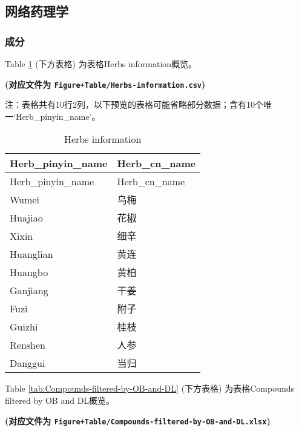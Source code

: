 \documentclass[
]{article}
\begin{document}
\hypertarget{ux7f51ux7edcux836fux7406ux5b66}{%
\subsection{网络药理学}\label{ux7f51ux7edcux836fux7406ux5b66}}

\hypertarget{ux6210ux5206}{%
\subsubsection{成分}\label{ux6210ux5206}}

Table \ref{tab:Herbs-information} (下方表格) 为表格Herbs information概览。

\textbf{(对应文件为 \texttt{Figure+Table/Herbs-information.csv})}

\begin{center}\begin{tcolorbox}[colback=gray!10, colframe=gray!50, width=0.9\linewidth, arc=1mm, boxrule=0.5pt]注：表格共有10行2列，以下预览的表格可能省略部分数据；含有10个唯一`Herb\_pinyin\_name'。
\end{tcolorbox}
\end{center}

\begin{longtable}[]{@{}ll@{}}
\caption{\label{tab:Herbs-information}Herbs information}\tabularnewline
\toprule
Herb\_pinyin\_name & Herb\_cn\_name\tabularnewline
\midrule
\endfirsthead
\toprule
Herb\_pinyin\_name & Herb\_cn\_name\tabularnewline
\midrule
\endhead
Wumei & 乌梅\tabularnewline
Huajiao & 花椒\tabularnewline
Xixin & 细辛\tabularnewline
Huanglian & 黄连\tabularnewline
Huangbo & 黄柏\tabularnewline
Ganjiang & 干姜\tabularnewline
Fuzi & 附子\tabularnewline
Guizhi & 桂枝\tabularnewline
Renshen & 人参\tabularnewline
Danggui & 当归\tabularnewline
\bottomrule
\end{longtable}

Table \ref{tab:Compounds-filtered-by-OB-and-DL} (下方表格) 为表格Compounds filtered by OB and DL概览。

\textbf{(对应文件为 \texttt{Figure+Table/Compounds-filtered-by-OB-and-DL.xlsx})}
\end{document}
